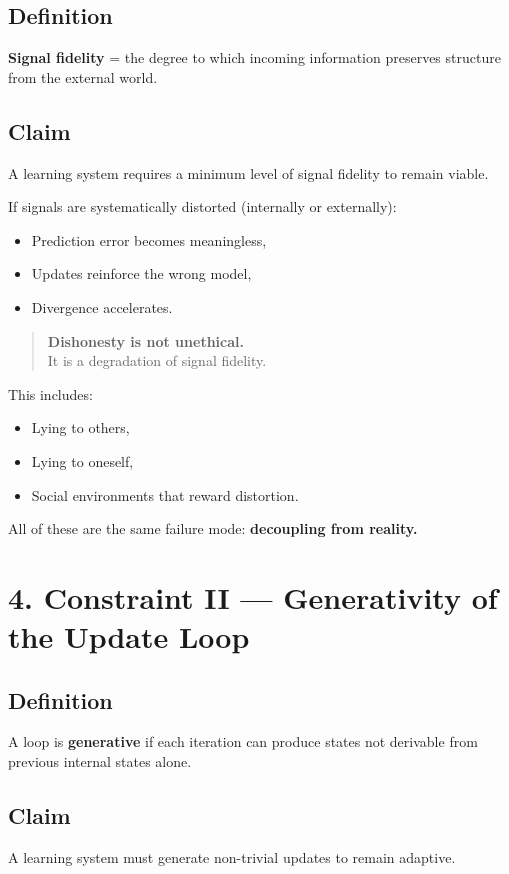 \documentclass[11pt, a4paper]{article}
\begin{document}
\subsection*{Definition}
\textbf{Signal fidelity} = the degree to which incoming information preserves structure from the external world.

\subsection*{Claim}
A learning system requires a minimum level of signal fidelity to remain viable.

If signals are systematically distorted (internally or externally):
\begin{itemize}
    \item Prediction error becomes meaningless,
    \item Updates reinforce the wrong model,
    \item Divergence accelerates.
\end{itemize}

\begin{quote}
    \textbf{Dishonesty is not unethical.} \\
    It is a degradation of signal fidelity.
\end{quote}

This includes:
\begin{itemize}
    \item Lying to others,
    \item Lying to oneself,
    \item Social environments that reward distortion.
\end{itemize}

All of these are the same failure mode: \textbf{decoupling from reality.}

\section*{4. Constraint II — Generativity of the Update Loop}

\subsection*{Definition}
A loop is \textbf{generative} if each iteration can produce states not derivable from previous internal states alone.

\subsection*{Claim}
A learning system must generate non-trivial updates to remain adaptive.
\end{document}
